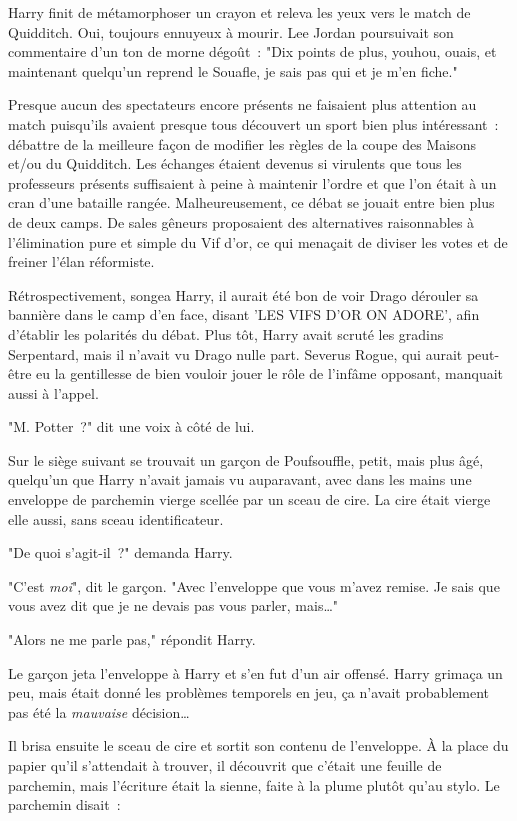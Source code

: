 Harry finit de métamorphoser un crayon et releva les yeux vers le match de Quidditch. Oui, toujours ennuyeux à mourir. Lee Jordan poursuivait son commentaire d'un ton de morne dégoût~: "Dix points de plus, youhou, ouais, et maintenant quelqu'un reprend le Souafle, je sais pas qui et je m'en fiche."

Presque aucun des spectateurs encore présents ne faisaient plus attention au match puisqu'ils avaient presque tous découvert un sport bien plus intéressant~: débattre de la meilleure façon de modifier les règles de la coupe des Maisons et/ou du Quidditch. Les échanges étaient devenus si virulents que tous les professeurs présents suffisaient à peine à maintenir l'ordre et que l'on était à un cran d'une bataille rangée. Malheureusement, ce débat se jouait entre bien plus de deux camps. De sales gêneurs proposaient des alternatives raisonnables à l'élimination pure et simple du Vif d'or, ce qui menaçait de diviser les votes et de freiner l'élan réformiste.

Rétrospectivement, songea Harry, il aurait été bon de voir Drago dérouler sa bannière dans le camp d'en face, disant 'LES VIFS D'OR ON ADORE', afin d'établir les polarités du débat. Plus tôt, Harry avait scruté les gradins Serpentard, mais il n'avait vu Drago nulle part. Severus Rogue, qui aurait peut-être eu la gentillesse de bien vouloir jouer le rôle de l'infâme opposant, manquait aussi à l'appel.

"M. Potter~?" dit une voix à côté de lui.

Sur le siège suivant se trouvait un garçon de Poufsouffle, petit, mais plus âgé, quelqu'un que Harry n'avait jamais vu auparavant, avec dans les mains une enveloppe de parchemin vierge scellée par un sceau de cire. La cire était vierge elle aussi, sans sceau identificateur.

"De quoi s'agit-il~?" demanda Harry.

"C'est \emph{moi}", dit le garçon. "Avec l'enveloppe que vous m'avez remise. Je sais que vous avez dit que je ne devais pas vous parler, mais…"

"Alors ne me parle pas," répondit Harry.

Le garçon jeta l'enveloppe à Harry et s'en fut d'un air offensé. Harry grimaça un peu, mais était donné les problèmes temporels en jeu, ça n'avait probablement pas été la \emph{mauvaise} décision…

Il brisa ensuite le sceau de cire et sortit son contenu de l'enveloppe. À la place du papier qu'il s'attendait à trouver, il découvrit que c'était une feuille de parchemin, mais l'écriture était la sienne, faite à la plume plutôt qu'au stylo. Le parchemin disait~:

